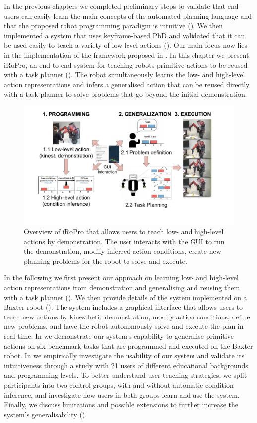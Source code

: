In the previous chapters we completed preliminary steps to validate that end-users can easily learn the main concepts of the automated planning language and that the proposed robot programming paradigm is intuitive ().
We then implemented a system that uses keyframe-based PbD and validated that it can be used easily to teach a variety of low-level actions ().
Our main focus now lies in the implementation of the framework proposed in .
In this chapter we present iRoPro, an end-to-end system for teaching robots primitive actions to be reused with a task planner ().
The robot simultaneously learns the low- and high-level action representations and infers a generalised action that can be reused directly with a task planner to solve problems that go beyond the initial demonstration.

\begin{figure}[h]
	\centering
	\includegraphics[width=0.7\linewidth]{figures/overview.pdf}
	\caption{Overview of iRoPro that allows users to teach low- and high-level actions by demonstration. The user interacts with the GUI to run the demonstration, modify inferred action conditions, create new planning problems for the robot to solve and execute.}
	\label{fig:overview}
\end{figure}	

In the following we first present our approach on learning low- and high-level action representations from demonstration and generalising and reusing them with a task planner ().
We then provide details of the system implemented on a Baxter robot (). 
The system includes a graphical interface that allows users to teach new actions by kinesthetic demonstration, modify action conditions, define new problems, and have the robot autonomously solve and execute the plan in real-time.
In  we demonstrate our system's capability to generalise primitive actions on six benchmark tasks that are programmed and executed on the Baxter robot.
In  we empirically investigate the usability of our system and validate its intuitiveness through a study with 21 users of different educational backgrounds and programming levels.
To better understand user teaching strategies, we split participants into two control groups, with and without automatic condition inference, and investigate how users in both groups learn and use the system.
Finally, we discuss limitations and possible extensions to further increase the system's generalisability ().

